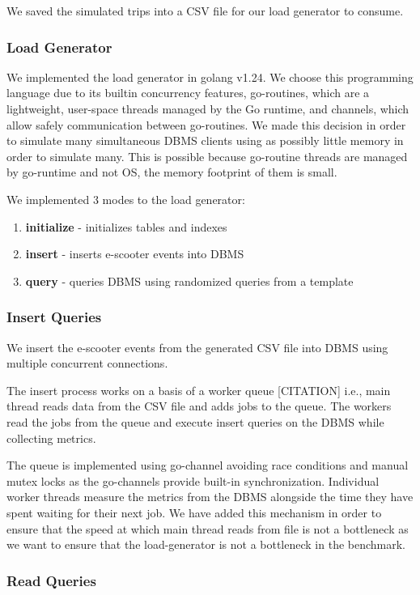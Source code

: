 We saved the simulated trips into a CSV file for our load generator to consume.

\subsubsection{Load Generator}
We implemented the load generator in golang v1.24.
We choose this programming language due to its builtin concurrency features, go-routines, which are a lightweight, user-space threads managed by the Go runtime, and channels, which allow safely communication between go-routines.
We made this decision in order to simulate many simultaneous DBMS clients using as possibly little memory in order to simulate many.
This is possible because go-routine threads are managed by go-runtime and not OS, the memory footprint of them is small.

We implemented 3 modes to the load generator:
\begin{enumerate}
	\item \textbf{initialize} - initializes tables and indexes
	\item \textbf{insert} - inserts e-scooter events into DBMS
	\item \textbf{query} - queries DBMS using randomized queries from a template
\end{enumerate}


\subsubsection{Insert Queries}
We insert the e-scooter events from the generated CSV file into DBMS using multiple concurrent connections.

The insert process works on a basis of a worker queue [CITATION] i.e., main thread reads data from the CSV file and adds jobs to the queue.
The workers read the jobs from the queue and execute insert queries on the DBMS while collecting metrics.

The queue is implemented using go-channel avoiding race conditions and manual mutex locks as the go-channels provide built-in synchronization.
Individual worker threads measure the metrics from the DBMS alongside the time they have spent waiting for their next job.
We have added this mechanism in order to ensure that the speed at which main thread reads from file is not a bottleneck as we want to ensure that the load-generator is not a bottleneck in the benchmark.

\subsubsection{Read Queries}

